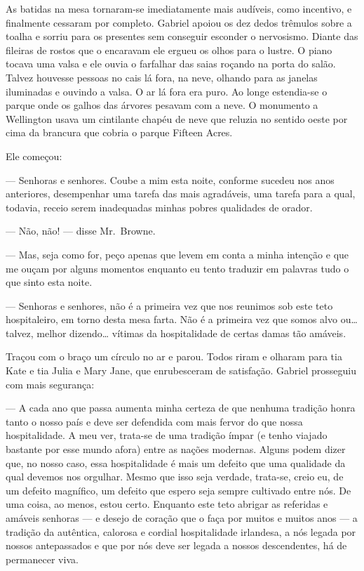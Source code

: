 As batidas na mesa tornaram-se imediatamente mais audíveis, como incentivo, e
finalmente cessaram por completo.  Gabriel apoiou os dez dedos trêmulos sobre a
toalha e sorriu para os presentes sem conseguir esconder o nervosismo.  Diante
das fileiras de rostos que o encaravam ele ergueu os olhos para o lustre.  O
piano tocava uma valsa e ele ouvia o farfalhar das saias roçando na porta do
salão.  Talvez houvesse pessoas no cais lá fora, na neve, olhando para as
janelas iluminadas e ouvindo a valsa.  O ar lá fora era puro.  Ao longe
estendia-se o parque onde os galhos das árvores pesavam com a neve.  O
monumento a Wellington usava um cintilante chapéu de neve que reluzia no
sentido oeste por cima da brancura que cobria o parque Fifteen Acres.

Ele começou:

--- Senhoras e senhores.  Coube a mim esta noite, conforme sucedeu nos anos
anteriores, desempenhar uma tarefa das mais agradáveis, uma tarefa para a qual,
todavia, receio serem inadequadas minhas pobres qualidades de orador.

--- Não, não! --- disse Mr.~Browne.

--- Mas, seja como for, peço apenas que levem em conta a minha intenção e que
me ouçam por alguns momentos enquanto eu tento traduzir em palavras tudo o que
sinto esta noite.

--- Senhoras e senhores, não é a primeira vez que nos reunimos sob este teto
hospitaleiro, em torno desta mesa farta.  Não é a primeira vez que somos alvo
ou\ldots{} talvez, melhor dizendo\ldots{} vítimas da hospitalidade de certas
damas tão amáveis.

Traçou com o braço um círculo no ar e parou.  Todos riram e olharam para tia
Kate e tia Julia e Mary Jane, que enrubesceram de satisfação.  Gabriel
prosseguiu com mais segurança:

--- A cada ano que passa aumenta minha certeza de que nenhuma tradição honra
tanto o nosso país e deve ser defendida com mais fervor do que nossa
hospitalidade.  A meu ver, trata-se de uma tradição ímpar (e tenho viajado
bastante por esse mundo afora) entre as nações modernas.  Alguns podem dizer
que, no nosso caso, essa hospitalidade é mais um defeito que uma qualidade da
qual devemos nos orgulhar.  Mesmo que isso seja verdade, trata-se, creio eu, de
um defeito magnífico, um defeito que espero seja sempre cultivado entre nós.
De uma coisa, ao menos, estou certo.  Enquanto este teto abrigar as referidas e
amáveis senhoras --- e desejo de coração que o faça por muitos e muitos anos
--- a tradição da autêntica, calorosa e cordial hospitalidade irlandesa, a nós
legada por nossos antepassados e que por nós deve ser legada a nossos
descendentes, há de permanecer viva.

